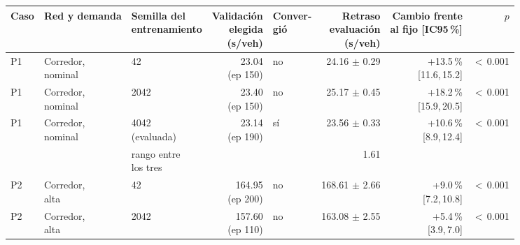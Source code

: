 \begin{table}[H]
\centering
\scriptsize
\setlength{\tabcolsep}{3pt}
\begin{tabular}{lllrlrrr}
\toprule
Caso & Red y demanda & \makecell{Semilla del\\entrenamiento} & \makecell{Validación\\elegida\\(s/veh)} & \makecell{Conver-\\gió} & \makecell{Retraso\\evaluación\\(s/veh)} & \makecell{Cambio frente\\al fijo [IC95\,\%]} & $p$ \\
\midrule
P1 & \makecell[l]{Corredor,\\{}nominal} & 42 & \makecell[r]{23.04\\{}(ep 150)} & no & \makecell[r]{24.16\\{}$\pm$ 0.29} & \makecell[r]{+13.5\,\%\\{}[11.6,\,15.2]} & $<$\,0.001 \\
P1 & \makecell[l]{Corredor,\\{}nominal} & 2042 & \makecell[r]{23.40\\{}(ep 150)} & no & \makecell[r]{25.17\\{}$\pm$ 0.45} & \makecell[r]{+18.2\,\%\\{}[15.9,\,20.5]} & $<$\,0.001 \\
P1 & \makecell[l]{Corredor,\\{}nominal} & \makecell[l]{4042\\{}(evaluada)} & \makecell[r]{23.14\\{}(ep 190)} & sí & \makecell[r]{23.56\\{}$\pm$ 0.33} & \makecell[r]{+10.6\,\%\\{}[8.9,\,12.4]} & $<$\,0.001 \\
 & & \makecell[l]{rango entre\\{}los tres} & & & 1.61 & & \\
P2 & \makecell[l]{Corredor,\\{}alta} & 42 & \makecell[r]{164.95\\{}(ep 200)} & no & \makecell[r]{168.61\\{}$\pm$ 2.66} & \makecell[r]{+9.0\,\%\\{}[7.2,\,10.8]} & $<$\,0.001 \\
P2 & \makecell[l]{Corredor,\\{}alta} & 2042 & \makecell[r]{157.60\\{}(ep 110)} & no & \makecell[r]{163.08\\{}$\pm$ 2.55} & \makecell[r]{+5.4\,\%\\{}[3.9,\,7.0]} & $<$\,0.001 \\

\end{tabular}
\end{table}
